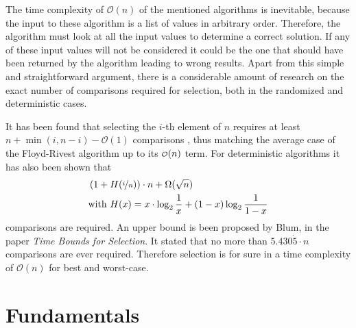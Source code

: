 \documentclass[twoside,leqno,twocolumn]{article}
\newcommand\smallO{
\mathchoice
{{\scriptstyle\mathcal{O}}}%
{{\scriptstyle\mathcal{O}}}%
{{\scriptscriptstyle\mathcal{O}}}%
{\scalebox{.50}{$\scriptscriptstyle\mathcal{O}$}}%
}
\begin{document}
The time complexity of $\mathcal{O}(n)$ of the mentioned algorithms is inevitable, because the input to these algorithm is a list of values in arbitrary order.
Therefore, the algorithm must look at all the input values to determine a correct solution.
If any of these input values will not be considered it could be the one that should have been returned by the algorithm leading to wrong results.
Apart from this simple and straightforward argument, there is a considerable amount of research on the exact number of comparisons required for selection, both in the randomized and deterministic cases.

It has been found that selecting the $i$-th element of $n$ requires at least $n + \min(i, n - i) - \mathcal{O}(1)$ comparisons \cite{cunto1989}, thus matching the average case of the Floyd-Rivest algorithm up to its $\smallO(n)$ term.
For deterministic algorithms it has also been shown that
\begin{eqnarray*}
  &\left (1 + H(\nicefrac{i}{n}) \right ) \cdot n + \Omega(\sqrt n) \\
  &\text{with~} H(x) = x \cdot \log_2 \frac{1}{x} + (1 - x) \log_2 \frac{1}{1 - x}
\end{eqnarray*}
comparisons are required.
An upper bound is been proposed by Blum, in the paper \textit{Time Bounds for Selection}. \cite{Blum1972}
It stated that no more than $5.430\dot{5} \cdot n$ comparisons are ever required. \cite{Blum1972}
Therefore selection is for sure in a time complexity of $\mathcal{O}(n)$ for best and worst-case.

\section{Fundamentals}
\end{document}
